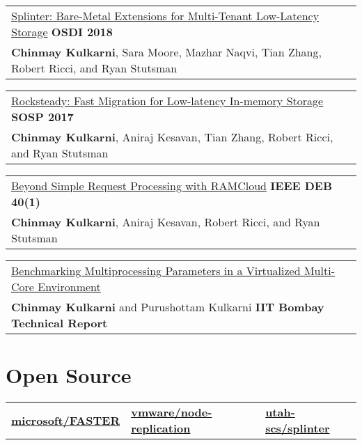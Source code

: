 \documentclass[margin,line]{res}
\begin{document}
\begin{resume}
 \vspace{-7pt}
 \begin{tabular}{@{}p{5.5in}p{4in}}
 \href{http://utah.systems/projects/kulkarni\_splinter}{Splinter:
 Bare-Metal Extensions for Multi-Tenant Low-Latency Storage} \hfill
 {\small\bf OSDI 2018}\\
 {\small{\bf Chinmay Kulkarni}, Sara Moore, Mazhar Naqvi, Tian Zhang, Robert
 Ricci, and Ryan Stutsman}\\
 \end{tabular}

 \vspace{-7pt}
 \begin{tabular}{@{}p{5.5in}p{4in}}
 \href{http://utah.systems/projects/kulkarni\_rocksteady}{Rocksteady: Fast
 Migration for Low-latency In-memory Storage} \hfill
 {\small\bf SOSP 2017}\\
 {\small{\bf Chinmay Kulkarni}, Aniraj Kesavan, Tian Zhang, Robert
 Ricci, and Ryan Stutsman}\\
 \end{tabular}

\vspace{-7pt}
\begin{tabular}{@{}p{5.5in}p{4in}}
\href{http://sites.computer.org/debull/A17mar/p62.pdf}{Beyond Simple
Request Processing with RAMCloud} \hfill
{\small\bf IEEE DEB 40(1)}\\
{\small {\bf Chinmay Kulkarni}, Aniraj Kesavan, Robert Ricci, and Ryan
Stutsman}\\
\end{tabular}

\vspace{-7pt}
\begin{tabular}{@{}p{5.5in}p{4in}}
\href{https://chinkulkarni.github.io/public/TR-CSE-2015-76.pdf}
{Benchmarking Multiprocessing Parameters in a Virtualized Multi-Core
Environment}\\
{\small{\bf Chinmay Kulkarni} and Purushottam Kulkarni} \hfill
{\small\bf IIT Bombay Technical Report}\\
\end{tabular}

\section{\sc Open Source}
\begin{tabular}{@{}p{2in}p{2in}p{2in}}
\href{{https://github.com/microsoft/FASTER}}{{\bf microsoft/FASTER}}
&
%
\href{{https://github.com/vmware/node-replication}}{{\bf vmware/node-replication}}
&
%
\href{{https://github.com/utah-scs/splinter}}
{{\bf utah-scs/splinter}}
\end{tabular}


\end{resume}
\end{document}
